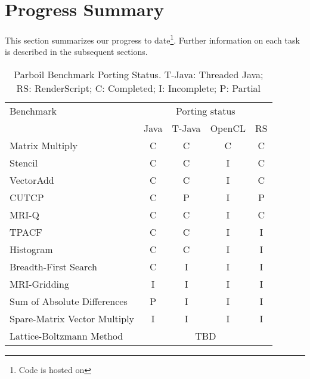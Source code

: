 \section*{Progress Summary}

This section summarizes our progress to date\footnote{Code is hosted on }.
Further information on each task
is described in the subsequent sections.


\begin{table}[h]\small
\centering
\begin{tabular}{ | l | c | c | c | c |}
    \hline 
    Benchmark & \multicolumn{4}{|c|}{Porting status} \\ \cline{2-5}
              & Java & T-Java & OpenCL & RS \\ \hline
    Matrix Multiply & C & C & C & C \\ \hline
    Stencil & C & C & I & C \\ \hline
    VectorAdd & C & C & I & C \\ \hline
    CUTCP & C & P  & I  & P \\ \hline
    MRI-Q & C & C & I & C \\ \hline
    TPACF & C & C & I & I \\ \hline
    Histogram & C & C & I & I \\ \hline
    Breadth-First Search & C & I & I & I \\ \hline
    MRI-Gridding & I & I & I & I \\ \hline
    Sum of Absolute Differences & P & I & I & I \\ \hline
    Spare-Matrix Vector Multiply & I & I & I & I \\ \hline
    Lattice-Boltzmann Method & \multicolumn{4}{|c|}{TBD} \\ \hline
    \hline
\end{tabular}
\caption{Parboil Benchmark Porting Status. T-Java: Threaded Java; RS:
RenderScript; C: Completed; I: Incomplete; P: Partial}
\label{table:parboil}
\end{table}

